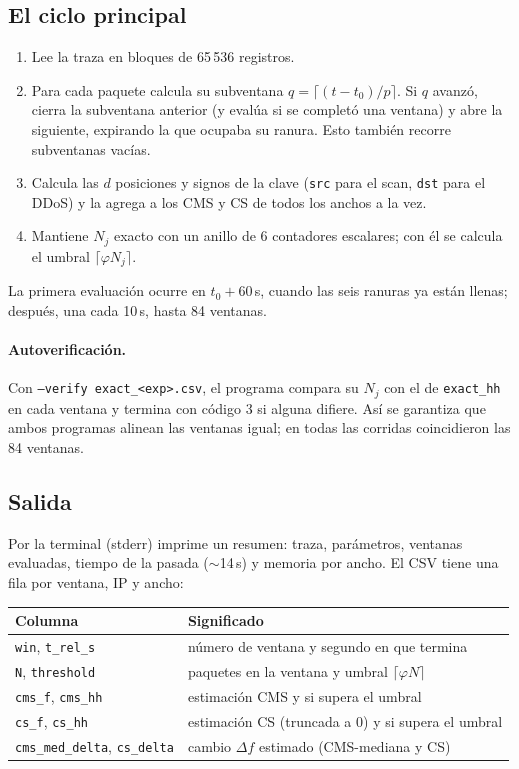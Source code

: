 \documentclass[11pt]{article}
\newcommand{\code}[1]{\texttt{#1}}
\begin{document}
\subsection{El ciclo principal}
\begin{enumerate}
    \item Lee la traza en bloques de 65\,536 registros.
    \item Para cada paquete calcula su subventana $q=\lceil(t-t_0)/p\rceil$. Si $q$ avanzó, cierra la subventana anterior (y evalúa si se completó una ventana) y abre la siguiente, expirando la que ocupaba su ranura. Esto también recorre subventanas vacías.
    \item Calcula las $d$ posiciones y signos de la clave (\code{src} para el scan, \code{dst} para el DDoS) y la agrega a los CMS y CS de todos los anchos a la vez.
    \item Mantiene $N_j$ exacto con un anillo de 6 contadores escalares; con él se calcula el umbral $\lceil\varphi N_j\rceil$.
\end{enumerate}

La primera evaluación ocurre en $t_0+60$\,s, cuando las seis ranuras ya están llenas; después, una cada 10\,s, hasta 84 ventanas.

\paragraph{Autoverificación.} Con \code{--verify exact\_<exp>.csv}, el programa compara su $N_j$ con el de \code{exact\_hh} en cada ventana y termina con código 3 si alguna difiere. Así se garantiza que ambos programas alinean las ventanas igual; en todas las corridas coincidieron las 84 ventanas.

\subsection{Salida}
Por la terminal (stderr) imprime un resumen: traza, parámetros, ventanas evaluadas, tiempo de la pasada ($\sim$14\,s) y memoria por ancho. El CSV tiene una fila por ventana, IP y ancho:

\begin{center}
\small
\begin{tabular}{ll}
\toprule
Columna & Significado \\
\midrule
\code{win}, \code{t\_rel\_s} & número de ventana y segundo en que termina \\
\code{N}, \code{threshold} & paquetes en la ventana y umbral $\lceil\varphi N\rceil$ \\
\code{cms\_f}, \code{cms\_hh} & estimación CMS y si supera el umbral \\
\code{cs\_f}, \code{cs\_hh} & estimación CS (truncada a 0) y si supera el umbral \\
\code{cms\_med\_delta}, \code{cs\_delta} & cambio $\Delta f$ estimado (CMS-mediana y CS) \\
\bottomrule
\end{tabular}
\end{center}
\end{document}
